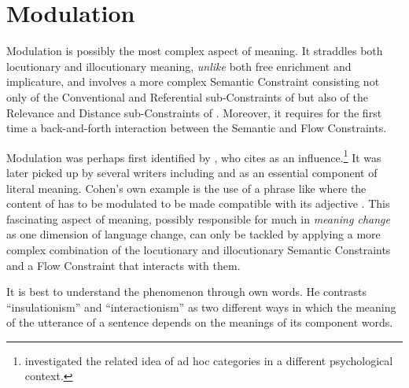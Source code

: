 \chapter{Modulation} \label{ch:modulation}

Modulation is possibly the most complex aspect of meaning. It straddles both locutionary and illocutionary meaning, \emph{unlike} both free enrichment and implicature, and involves a more complex Semantic Constraint consisting not only of the Conventional and Referential sub-Constraints of  but also of the Relevance and Distance sub-Constraints of . Moreover, it requires for the first time a back-and-forth interaction between the Semantic and Flow Constraints.

Modulation was perhaps first identified by \citet{cohen:pa, cohen:ci}, who cites \citet{ross:pa} as an influence.\footnote{\citet{barsalou:ahc, barsalou:igs} investigated the related idea of ad hoc categories in a different psychological context.} It was later picked up by several writers including \citet{recanati:lm, recanati:tcp} and \citet{wc:lp} as an essential component of literal meaning. Cohen's own example is the use of a phrase like  where the content of  has to be modulated to be made compatible with its adjective . This fascinating aspect of meaning, possibly responsible for much in \emph{meaning change} as one dimension of language change, can only be tackled by applying a more complex combination of the locutionary and illocutionary Semantic Constraints and a Flow Constraint that interacts with them.

It is best to understand the phenomenon through  own words. He contrasts ``insulationism'' and ``interactionism'' as two different ways in which the meaning of the utterance of a sentence depends on the meanings of its component words.

